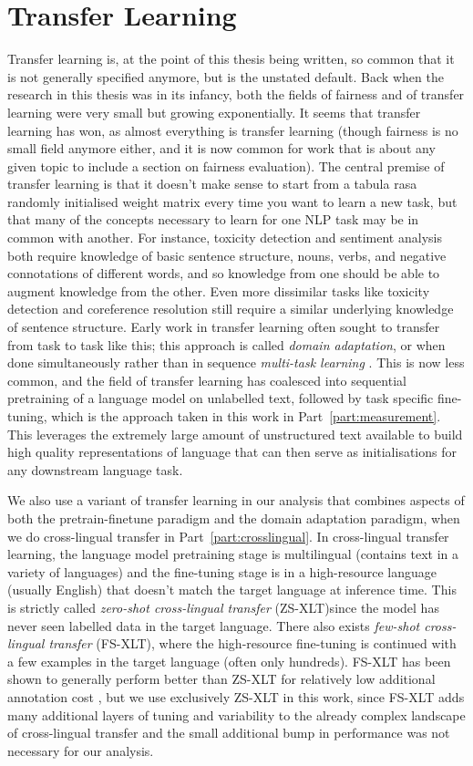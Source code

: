 \section{Transfer Learning}
Transfer learning is, at the point of this thesis being written, so common that it is not generally specified anymore, but is the unstated default. Back when the research in this thesis was in its infancy, both the fields of fairness and of transfer learning were very small but growing exponentially. It seems that transfer learning has won, as almost everything is transfer learning (though fairness is no small field anymore either, and it is now common for work that is about any given topic to include a section on fairness evaluation). 
The central premise of transfer learning is that it doesn't make sense to start from a tabula rasa randomly initialised weight matrix every time you want to learn a new task, but that many of the concepts necessary to learn for one NLP task may be in common with another. For instance, toxicity detection and sentiment analysis both require knowledge of basic sentence structure, nouns, verbs, and negative connotations of different words, and so knowledge from one should be able to augment knowledge from the other. Even more dissimilar tasks like toxicity detection and coreference resolution still require a similar underlying knowledge of sentence structure. Early work in transfer learning often sought to transfer from task to task like this; this approach is called \textit{domain adaptation}, or when done simultaneously rather than in sequence \textit{multi-task learning} \citep{ruder2019transfer}. This is now less common, and the field of transfer learning has coalesced into sequential pretraining of a language model on unlabelled text, followed by task specific fine-tuning, which is the approach taken in this work in Part~\ref{part:measurement}. This leverages the extremely large amount of unstructured text available to build high quality representations of language that can then serve as initialisations for any downstream language task.

We also use a variant of transfer learning in our analysis that combines aspects of both the pretrain-finetune paradigm and the domain adaptation paradigm, when we do cross-lingual transfer in Part~\ref{part:crosslingual}. In cross-lingual transfer learning, the language model pretraining stage is multilingual (contains text in a variety of languages) and the fine-tuning stage is in a high-resource language (usually English) that doesn't match the target language at inference time. This is strictly called \textit{zero-shot cross-lingual transfer} (ZS-XLT)since the model has never seen labelled data in the target language. There also exists \textit{few-shot cross-lingual transfer} (FS-XLT), where the high-resource fine-tuning is continued with a few examples in the target language (often only hundreds). FS-XLT has been shown to generally perform better than ZS-XLT for relatively low additional annotation cost \citep{}, but we use exclusively ZS-XLT in this work, since FS-XLT adds many additional layers of tuning and variability to the already complex landscape of cross-lingual transfer and the small additional bump in performance was not necessary for our analysis.


